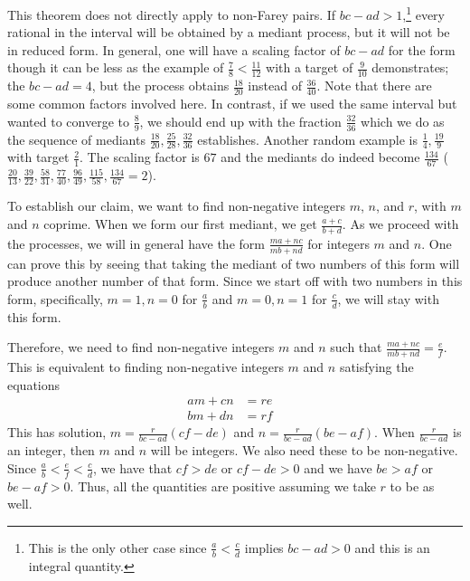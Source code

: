 \documentclass[12pt]{article}
\theoremstyle{remark}
\begin{document}
This theorem does not directly apply to non-Farey pairs. If $bc-ad > 1$,\footnote{This is the only other case since $\frac{a}{b} < \frac{c}{d}$ implies $bc - ad > 0$ and this is an integral quantity.} every rational in the interval will be obtained by a mediant process, but it will not be in reduced form. In general, one will have a scaling factor of $bc-ad$ for the form though it can be less as the example of $\frac{7}{8}< \frac{11}{12}$ with a target of $\frac{9}{10}$ demonstrates; the $bc-ad = 4$, but the process obtains $\frac{18}{20}$ instead of $\frac{36}{40}$. Note that there are some common factors involved here. In contrast, if we used the same interval but wanted to converge to $\frac{8}{9}$, we should end up with the fraction $\frac{32}{36}$ which we do as the sequence of mediants $\frac{18}{20}, \frac{25}{28}, \frac{32}{36}$ establishes. Another random example is  $\frac{1}{4} , \frac{19}{9}$ with target $\frac{2}{1}$. The scaling factor is $67$ and the mediants do indeed become $\frac{134}{67}$  ($\frac{20}{13}, \frac{39}{22}, \frac{58}{31}, \frac{77}{40}, \frac{96}{49}, \frac{115}{58}, \frac{134}{67} = 2$). 


To establish our claim, we want to find non-negative integers $m$, $n$, and $r$, with $m$ and $n$ coprime. When we form our first mediant, we get $\frac{a+c}{b+d}$. As we proceed with the processes, we will in general have the form $\frac{ma + nc}{mb + nd}$ for integers $m$ and $n$. One can prove this by seeing that taking the mediant of two numbers of this form will produce another number of that form. Since we start off with two numbers in this form, specifically, $m=1, n=0$ for $\frac{a}{b}$ and $m=0, n=1$ for $\frac{c}{d}$, we will stay with this form. 

Therefore, we need to find non-negative integers $m$ and $n$ such that $\frac{ma+nc}{mb+nd} = \frac{e}{f}$. This is equivalent to finding non-negative integers $m$ and $n$
satisfying the equations
\begin{align*}
    am + cn &= re & \\
    bm + dn &= rf & 
\end{align*}
This has solution, $m = \frac{r}{bc-ad} (cf-de)$ and $n= \frac{r}{bc-ad} (be-af)$. When $\frac{r}{bc-ad}$ is an integer, then $m$ and $n$ will be integers. We also need these to be non-negative. Since $\frac{a}{b} < \frac{e}{f} < \frac{c}{d}$, we have that $cf>de$ or $cf - de > 0$ and we have $be>af$ or $be - af > 0$. Thus, all the quantities are positive assuming we take $r$ to be as well. 
\end{document}
